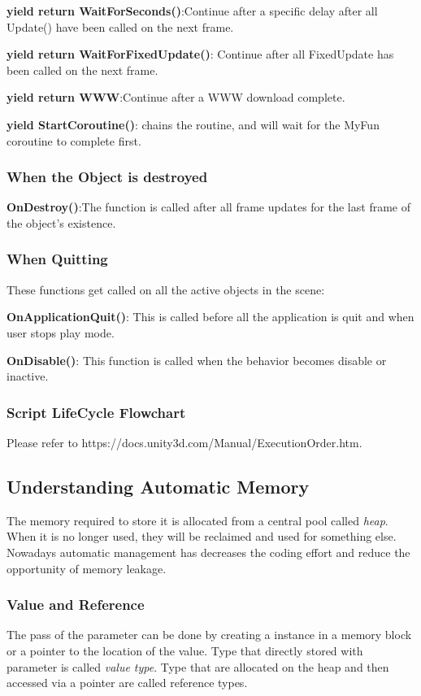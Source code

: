 \documentclass[10pt, a4paper]{article}
\begin{document}
                \textbf{yield return WaitForSeconds()}:Continue after a specific delay after all Update() have been called on the next frame. 

                \textbf{yield return WaitForFixedUpdate()}: Continue after all FixedUpdate has been called on the next frame. 

                \textbf{yield return WWW}:Continue after a WWW download complete. 
                
                \textbf{yield StartCoroutine()}: chains the routine, and will wait for the MyFun coroutine to complete first. 
            \subsubsection{When the Object is destroyed}
                \textbf{OnDestroy()}:The function is called after all frame updates for the last frame of the object's existence. 
            \subsubsection{When Quitting}
                These functions get called on all the active objects in the scene:
                
                \textbf{OnApplicationQuit()}: This is called before all the application is quit and when user stops play mode. 

                \textbf{OnDisable()}: This function is called when the behavior becomes disable or inactive. 
            \subsubsection{Script LifeCycle Flowchart}
                Please refer to https://docs.unity3d.com/Manual/ExecutionOrder.htm. 
        \subsection{Understanding Automatic Memory}
            The memory required to store it is allocated from a central pool called \emph{heap}. When it is no longer used, they will be reclaimed and used for something else. Nowadays automatic management has decreases the coding effort and reduce the opportunity of memory leakage. 
            
            \subsubsection{Value and Reference}
                The pass of the parameter can be done by creating a instance in a memory block or a pointer to the location of the value. Type that directly stored with parameter is called \emph{value type}. Type that are allocated on the heap and then accessed via a pointer are called reference types.
\end{document}
